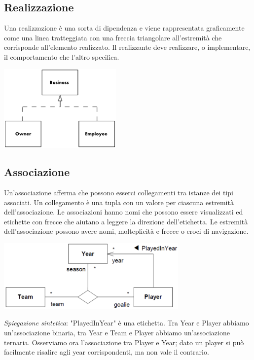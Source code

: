 \documentclass{article}
\begin{document}
\subsection*{Realizzazione}
\large

Una realizzazione è una sorta di dipendenza e viene rappresentata graficamente come una linea tratteggiata con una freccia triangolare all'estremità che corrisponde all'elemento realizzato.
Il realizzante deve realizzare, o implementare, il comportamento che l'altro specifica.
\begin{center}
    \includegraphics[width=0.45\textwidth]{foto 6.png}
\end{center}

\subsection*{Associazione}
\large

Un'associazione afferma che possono esserci collegamenti tra istanze dei tipi associati. Un collegamento è una tupla con un valore per ciascuna estremità dell'associazione. Le associazioni hanno nomi che possono essere visualizzati ed etichette con frecce che aiutano a leggere la direzione dell'etichetta. Le estremità dell'associazione possono avere nomi, molteplicità e frecce o croci di navigazione.
\begin{center}
    \includegraphics[width=0.7\textwidth]{foto 7.png}
\end{center}
\textit{Spiegazione sintetica}: "PlayedInYear" è una etichetta. Tra Year e Player abbiamo un'associazione binaria, tra Year e Team e Player abbiamo un'associazione ternaria. Osserviamo ora l'associazione tra Player e Year; dato un player si può facilmente risalire agli year corrispondenti, ma non vale il contrario.
\end{document}
